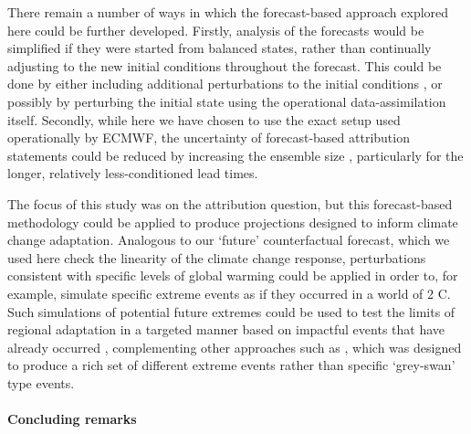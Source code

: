   There remain a number of ways in which the forecast-based approach explored here could be further developed. Firstly, analysis of the forecasts would be simplified if they were started from balanced states, rather than continually adjusting to the new initial conditions throughout the forecast. This could be done by either including additional perturbations to the initial conditions \cite[ie. to the land-surface and atmospheric states,][]{wang_initialized_2021,reed_attribution_2022,wehner_operational_2022}, or possibly by perturbing the initial state using the operational data-assimilation itself. Secondly, while here we have chosen to use the exact setup used operationally by ECMWF, the uncertainty of forecast-based attribution statements could be reduced by increasing the ensemble size \cite[we note that 51 members is a relatively small ensemble in the context of traditional attribution-specific experiments,][]{massey_weatherhome-development_2015,ciavarella_upgrade_2018}, particularly for the longer, relatively less-conditioned lead times.

  The focus of this study was on the attribution question, but this forecast-based methodology could be applied to produce projections designed to inform climate change adaptation. Analogous to our `future' counterfactual forecast, which we used here check the linearity of the climate change response, perturbations consistent with specific levels of global warming could be applied in order to, for example, simulate specific extreme events as if they occurred in a world of 2 \textdegree{}C. Such simulations of potential future extremes could be used to test the limits of regional adaptation in a targeted manner based on impactful events that have already occurred \cite{hazeleger_tales_2015}, complementing other approaches such as \cite{leach_generating_2022}, which was designed to produce a rich set of different extreme events rather than specific `grey-swan' type events.

  \paragraph*{Concluding remarks}\label{ch4:remarks}

